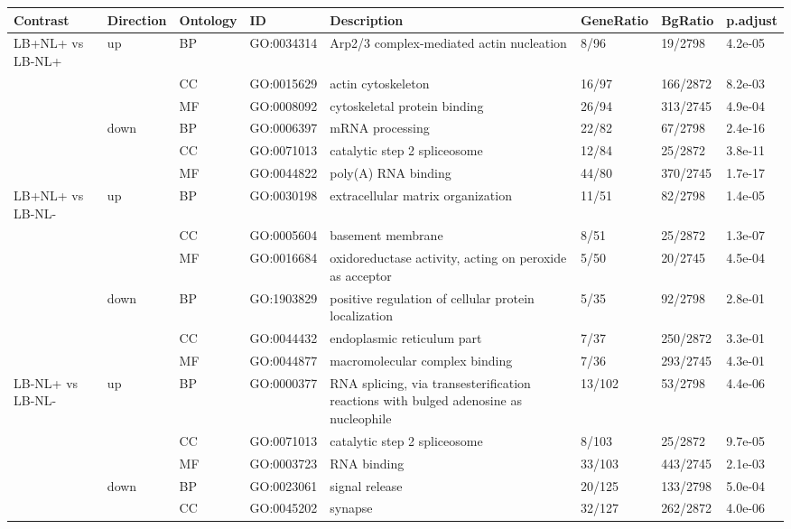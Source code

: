\documentclass[11pt]{article}\usepackage[]{graphicx}\usepackage[usenames,dvipsnames]{color}
\begin{document}
\begin{table}[ht]
\centering
\begingroup\scriptsize
\begin{tabular}{llllp{}lll}
  \toprule
Contrast & Direction & Ontology & ID & Description & GeneRatio & BgRatio & p.adjust \\ 
  \midrule
LB+NL+ vs LB-NL+ & up & BP & GO:0034314 & Arp2/3 complex-mediated actin nucleation & 8/96 & 19/2798 & 4.2e-05 \\ 
   &  & CC & GO:0015629 & actin cytoskeleton & 16/97 & 166/2872 & 8.2e-03 \\ 
   &  & MF & GO:0008092 & cytoskeletal protein binding & 26/94 & 313/2745 & 4.9e-04 \\ 
   & down & BP & GO:0006397 & mRNA processing & 22/82 & 67/2798 & 2.4e-16 \\ 
   &  & CC & GO:0071013 & catalytic step 2 spliceosome & 12/84 & 25/2872 & 3.8e-11 \\ 
   &  & MF & GO:0044822 & poly(A) RNA binding & 44/80 & 370/2745 & 1.7e-17 \\ 
   \midrule
LB+NL+ vs LB-NL- & up & BP & GO:0030198 & extracellular matrix organization & 11/51 & 82/2798 & 1.4e-05 \\ 
   &  & CC & GO:0005604 & basement membrane & 8/51 & 25/2872 & 1.3e-07 \\ 
   &  & MF & GO:0016684 & oxidoreductase activity, acting on peroxide as acceptor & 5/50 & 20/2745 & 4.5e-04 \\ 
   & down & BP & GO:1903829 & positive regulation of cellular protein localization & 5/35 & 92/2798 & 2.8e-01 \\ 
   &  & CC & GO:0044432 & endoplasmic reticulum part & 7/37 & 250/2872 & 3.3e-01 \\ 
   &  & MF & GO:0044877 & macromolecular complex binding & 7/36 & 293/2745 & 4.3e-01 \\ 
   \midrule
LB-NL+ vs LB-NL- & up & BP & GO:0000377 & RNA splicing, via transesterification reactions with bulged adenosine as nucleophile & 13/102 & 53/2798 & 4.4e-06 \\ 
   &  & CC & GO:0071013 & catalytic step 2 spliceosome & 8/103 & 25/2872 & 9.7e-05 \\ 
   &  & MF & GO:0003723 & RNA binding & 33/103 & 443/2745 & 2.1e-03 \\ 
   & down & BP & GO:0023061 & signal release & 20/125 & 133/2798 & 5.0e-04 \\ 
   &  & CC & GO:0045202 & synapse & 32/127 & 262/2872 & 4.0e-06 \\ 

\end{tabular}
\end{table}
\end{document}
